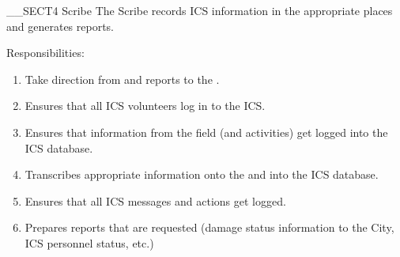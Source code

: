 __SECT4{ Scribe
\label{sec:Scribe} }
The Scribe records ICS information in the appropriate places and
generates reports.

Responsibilities:
\begin{enumerate}
\item Take direction from and reports to the \PlanningSectionChief.
\item Ensures that all ICS volunteers log in to the ICS.
\item Ensures that information from the field (\DamageAssessments and \ResponseTeams activities) get logged into the ICS database.
\item Transcribes appropriate information onto the \StatusBoard and into the ICS database.
\item Ensures that all ICS messages and actions get logged.
\item Prepares reports that are requested (damage status information to the City, ICS personnel status, etc.)
\end{enumerate}

